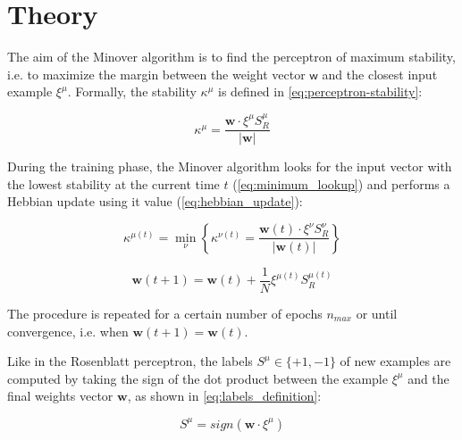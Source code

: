 \section{Theory}
\label{sec:theory}

The aim of the Minover algorithm is to find the perceptron of maximum stability, i.e. to maximize the margin between the weight vector $\bm{\mathsf{w}}$ and the closest input example $\xi^\mu$. Formally, the stability $\kappa^\mu$ is defined in \cref{eq:perceptron-stability}:

\begin{equation}
    \kappa^\mu = \frac{\mathsf{\bm{w}} \cdotp \xi^\mu S^\mu_R}{\lvert \mathsf{\bm{w}} \rvert}
    \label{eq:perceptron-stability}
\end{equation}

During the training phase, the Minover algorithm looks for the input vector with the lowest stability at the current time $t$ (\cref{eq:minimum_lookup}) and performs a Hebbian update using it value (\cref{eq:hebbian_update}):

\begin{equation}
    \kappa^{\mu(t)} = \min_\nu \left \{ \kappa^{\nu(t)} =  \frac{\mathsf{\bm{w}}(t) \cdotp \xi^\nu S^\nu_R}{\lvert \mathsf{\bm{w}}(t) \rvert} \right \}
    \label{eq:minimum_lookup}
\end{equation}

\begin{equation}
    \mathsf{\bm{w}}(t+1) = \mathsf{\bm{w}}(t) + \frac{1}{N} \xi^{\mu(t)} S^{\mu(t)}_R
    \label{eq:hebbian_update}
\end{equation}

The procedure is repeated for a certain number of epochs $n_{max}$ or until convergence, i.e. when $\mathsf{\bm{w}}(t+1) = \mathsf{\bm{w}}(t)$.

Like in the Rosenblatt perceptron, the labels $S^\mu \in \{+1, -1\}$ of new examples are computed by taking the sign of the dot product between the example $\xi^\mu$ and the final weights vector $\mathsf{\bm{w}}$, as shown in \cref{eq:labels_definition}:

\begin{equation}
    S^\mu = sign(\mathsf{\bm{w}} \cdotp \xi^\mu)
    \label{eq:labels_definition}
\end{equation}
